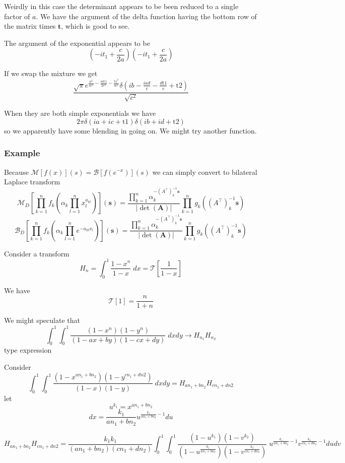 \documentclass{article}
\begin{document}
Weirdly in this case the determinant appears to be been reduced to a single factor of $a$. We have the argument of the delta function having the bottom row of the matrix times $\mathbf{t}$, which is good to see.     

The argument of the exponential appears to be 
$$
(-i t_1 + \frac{c}{2 a})(-i t_1 + \frac{c}{2 a})
$$         

If we swap the mixture we get 
$$
\frac{\sqrt{\pi } e^{\frac{a^2}{4 c^2}-\frac{i a \text{t1}}{2 c^2}-\frac{\text{t1}^2}{4 c^2}} \delta \left(i b-\frac{i a d}{c}-\frac{d \text{t1}}{c}+\text{t2}\right)}{\sqrt{c^2}}
$$

When they are both simple exponentials we have 
$$
2 \pi  \delta (i a+i c+\text{t1}) \delta (i b+i d+\text{t2})
$$
so we apparently have some blending in going on. We might try another function.

\subsubsection{Example}



Because $\mathcal{M}[f(x)](s) = \mathcal{B}[f(e^{-x})](s)$ we can simply convert to bilateral Laplace transform
$$
\mathcal{M}_D\left[\prod_{k=1}^n f_k \left(\alpha_k \prod_{l=1}^n x_l^{a_{kl}}\right) \right](\mathbf{s})=\frac{\prod_{k=1}^n \alpha_k^{-(A^\top)_k^{-1} \mathbf{s}}}{|\det(\mathbf{A})|} \prod_{k=1}^n g_k((A^\top)_k^{-1} \mathbf{s})
$$
$$
\mathcal{B}_D\left[\prod_{k=1}^n f_k \left(\alpha_k \prod_{l=1}^n e^{-a_{kl}x_l}\right) \right](\mathbf{s})=\frac{\prod_{k=1}^n \alpha_k^{-(A^\top)_k^{-1} \mathbf{s}}}{|\det(\mathbf{A})|} \prod_{k=1}^n g_k((A^\top)_k^{-1} \mathbf{s})
$$

Consider a transform
$$
H_n = \int_0^1 \frac{1-x^n}{1-x} \; dx = \mathcal{T}\left[\frac{1}{1-x}\right]
$$

We have 
$$
\mathcal{T}[1] = \frac{n}{1+n}
$$

We might speculate that 
$$
\int_0^1\int_0^1\frac{(1-x^n)(1-y^n)}{(1- a x + b y)(1 - c x + d y)} \; dx dy \to H_{n_1} H_{n_2}
$$
type expression

Consider
$$
\int_0^1\int_0^1\frac{(1-x^{a n_1 + b n_2})(1-y^{c n_1 + d n 2})}{(1 - x)(1 - y)} \; dx dy = H_{a n_1 + b n_2}H_{c n_1 + d n 2}
$$
let
$$
u^{k_1} = x^{a n_1 + b n_2}
$$
$$
dx = \frac{k_1}{a n_1 + b n_2}u^{\frac{k_1}{a n_1 + b n_2} -1} du
$$

$$
H_{a n_1 + b n_2}H_{c n_1 + d n 2} = \frac{k_1 k_1}{(a n_1 + b n_2)(c n_1 + d n_2)} \int_0^1\int_0^1\frac{(1-u^{k_1})(1-v^{k_2})}{(1 - u^{\frac{k_1}{a n_1 + b n_2}})(1 - v^{\frac{k_2}{c n_1 + d n_2}})} \; u^{\frac{k_1}{a n_1 + b n_2} -1}  v^{\frac{k_2}{c n_1 + d n_2} -1} du dv
$$
\end{document}
